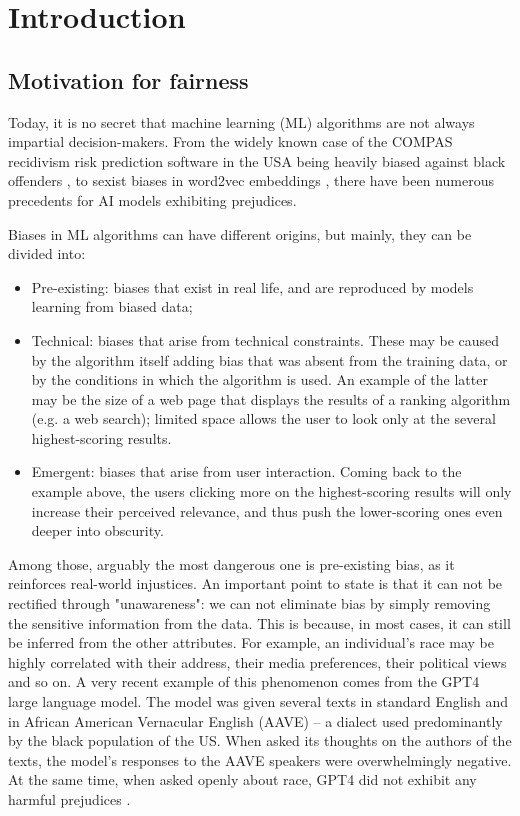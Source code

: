 \chapter{Introduction}
\label{introduction}


\section{Motivation for fairness}\label{sect:int_1}

Today, it is no secret that machine learning (ML) algorithms are not always impartial decision-makers. From the widely known case of the COMPAS recidivism risk prediction software in the USA being heavily biased against black offenders \cite{propublicacompas}, to sexist biases in word2vec embeddings \cite{1607.06520}, there have been numerous precedents for AI models exhibiting prejudices.

Biases in ML algorithms can have different origins, but mainly, they can be divided into:
\begin{itemize}
\item Pre-existing: biases that exist in real life, and are reproduced by models learning from biased data;
\item Technical: biases that arise from technical constraints. These may be caused by the algorithm itself adding bias that was absent from the training data, or by the conditions in which the algorithm is used. An example of the latter may be the size of a web page that displays the results of a ranking algorithm (e.g. a web search); limited space allows the user to look only at the several highest-scoring results.
\item Emergent: biases that arise from user interaction. Coming back to the example above, the users clicking more on the highest-scoring results will only increase their perceived relevance, and thus push the lower-scoring ones even deeper into obscurity.
\end{itemize}

Among those, arguably the most dangerous one is pre-existing bias, as it reinforces real-world injustices. An important point to state is that it can not be rectified through "unawareness": we can not eliminate bias by simply removing the sensitive information from the data. This is because, in most cases, it can still be inferred from the other attributes. For example, an individual’s race may be highly correlated with their address, their media preferences, their political views and so on. A very recent example of this phenomenon comes from the GPT4 large language model. The model was given several texts in standard English and in African American Vernacular English (AAVE) – a dialect used predominantly by the black population of the US. When asked its thoughts on the authors of the texts, the model’s responses to the AAVE speakers were overwhelmingly negative. At the same time, when asked openly about race, GPT4 did not exhibit any harmful prejudices \cite{2403.00742}.

